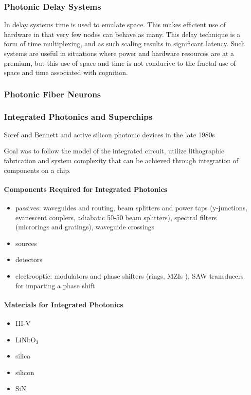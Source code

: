 \subsubsection{Photonic Delay Systems}
In delay systems time is used to emulate space. This makes efficient use of hardware in that very few nodes can behave as many. This delay technique is a form of time multiplexing, and as such scaling results in significant latency. Such systems are useful in situations where power and hardware resources are at a premium, but this use of space and time is not conducive to the fractal use of space and time associated with cognition.

\subsubsection{Photonic Fiber Neurons}
 
\subsubsection{Integrated Photonics and Superchips}
Soref and Bennett and active silicon photonic devices in the late 1980s

\vspace{3em}
Goal was to follow the model of the integrated circuit, utilize lithographic fabrication and system complexity that can be achieved through integration of components on a chip. 

\paragraph{Components Required for Integrated Photonics}
\begin{itemize}
\item passives: waveguides and routing, beam splitters and power taps (y-junctions, evanescent couplers, adiabatic 50-50 beam splitters), spectral filters (microrings \cite{ra2007} and gratings), waveguide crossings
\item sources
\item detectors
\item electrooptic: modulators and phase shifters (rings, MZIs \cite{ohno1975}), SAW transducers for imparting a phase shift
\end{itemize}

\paragraph{Materials for Integrated Photonics}
\begin{itemize}
\item III-V
\item LiNbO$_3$
\item silica
\item silicon
\item SiN
\end{itemize}

